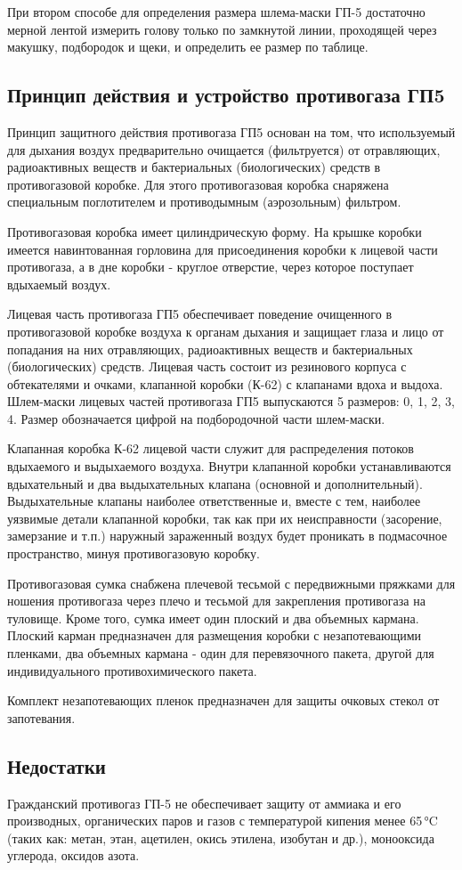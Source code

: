 При втором способе для определения размера шлема-маски ГП-5 достаточно мерной лентой измерить голову только по замкнутой линии, проходящей через макушку, подбородок и щеки, и определить ее размер по таблице.

\subsection*{Принцип действия и устройство противогаза ГП5}
Принцип защитного действия противогаза ГП5 основан на том, что используемый для дыхания воздух предварительно очищается (фильтруется) от отравляющих, радиоактивных веществ и бактериальных (биологических) средств в противогазовой коробке. Для этого противогазовая коробка снаряжена специальным поглотителем и противодымным (аэрозольным) фильтром.

Противогазовая коробка имеет цилиндрическую форму. На крышке коробки имеется навинтованная горловина для присоединения коробки к лицевой части противогаза, а в дне коробки - круглое отверстие, через которое поступает вдыхаемый воздух.

Лицевая часть противогаза ГП5 обеспечивает поведение очищенного в противогазовой коробке воздуха к органам дыхания и защищает глаза и лицо от попадания на них отравляющих, радиоактивных веществ и бактериальных (биологических) средств. Лицевая часть состоит из резинового корпуса с обтекателями и очками, клапанной коробки (К-62) с клапанами вдоха и выдоха. Шлем-маски лицевых частей противогаза ГП5 выпускаются 5 размеров: 0, 1, 2, 3, 4. Размер обозначается цифрой на подбородочной части шлем-маски.

Клапанная коробка К-62 лицевой части служит для распределения потоков вдыхаемого и выдыхаемого воздуха. Внутри клапанной коробки устанавливаются вдыхательный и два выдыхательных клапана (основной и дополнительный). Выдыхательные клапаны наиболее ответственные и, вместе с тем, наиболее уязвимые детали клапанной коробки, так как при их неисправности (засорение, замерзание и т.п.) наружный зараженный воздух будет проникать в подмасочное пространство, минуя противогазовую коробку.

Противогазовая сумка снабжена плечевой тесьмой с передвижными пряжками для ношения противогаза через плечо и тесьмой для закрепления противогаза на туловище. Кроме того, сумка имеет один плоский и два объемных кармана. Плоский карман предназначен для размещения коробки с незапотевающими пленками, два объемных кармана - один для перевязочного пакета, другой для индивидуального противохимического пакета.

Комплект незапотевающих пленок предназначен для защиты очковых стекол от запотевания.

\subsection*{Недостатки}
Гражданский противогаз ГП-5 не обеспечивает защиту от аммиака и его производных, органических паров и газов с температурой кипения менее 65 °C (таких как: метан, этан, ацетилен, окись этилена, изобутан и др.), монооксида углерода, оксидов азота.


